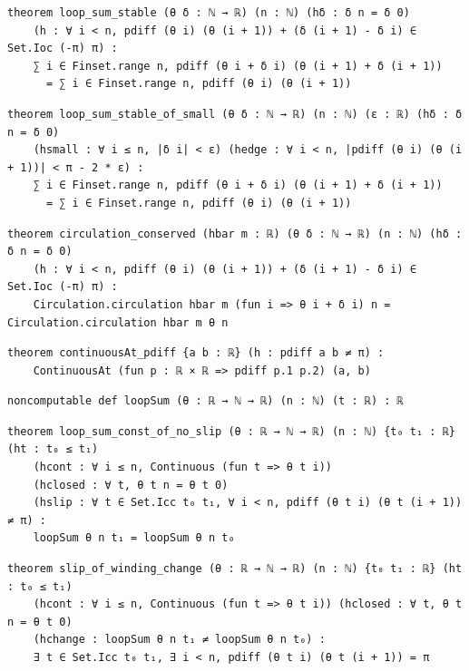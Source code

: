 \begin{lstlisting}[style=leancat]
theorem loop_sum_stable (θ δ : ℕ → ℝ) (n : ℕ) (hδ : δ n = δ 0)
    (h : ∀ i < n, pdiff (θ i) (θ (i + 1)) + (δ (i + 1) - δ i) ∈ Set.Ioc (-π) π) :
    ∑ i ∈ Finset.range n, pdiff (θ i + δ i) (θ (i + 1) + δ (i + 1))
      = ∑ i ∈ Finset.range n, pdiff (θ i) (θ (i + 1))
\end{lstlisting}

\begin{lstlisting}[style=leancat]
theorem loop_sum_stable_of_small (θ δ : ℕ → ℝ) (n : ℕ) (ε : ℝ) (hδ : δ n = δ 0)
    (hsmall : ∀ i ≤ n, |δ i| < ε) (hedge : ∀ i < n, |pdiff (θ i) (θ (i + 1))| < π - 2 * ε) :
    ∑ i ∈ Finset.range n, pdiff (θ i + δ i) (θ (i + 1) + δ (i + 1))
      = ∑ i ∈ Finset.range n, pdiff (θ i) (θ (i + 1))
\end{lstlisting}

\begin{lstlisting}[style=leancat]
theorem circulation_conserved (hbar m : ℝ) (θ δ : ℕ → ℝ) (n : ℕ) (hδ : δ n = δ 0)
    (h : ∀ i < n, pdiff (θ i) (θ (i + 1)) + (δ (i + 1) - δ i) ∈ Set.Ioc (-π) π) :
    Circulation.circulation hbar m (fun i => θ i + δ i) n = Circulation.circulation hbar m θ n
\end{lstlisting}

\begin{lstlisting}[style=leancat]
theorem continuousAt_pdiff {a b : ℝ} (h : pdiff a b ≠ π) :
    ContinuousAt (fun p : ℝ × ℝ => pdiff p.1 p.2) (a, b)
\end{lstlisting}

\begin{lstlisting}[style=leancat]
noncomputable def loopSum (θ : ℝ → ℕ → ℝ) (n : ℕ) (t : ℝ) : ℝ
\end{lstlisting}

\begin{lstlisting}[style=leancat]
theorem loop_sum_const_of_no_slip (θ : ℝ → ℕ → ℝ) (n : ℕ) {t₀ t₁ : ℝ} (ht : t₀ ≤ t₁)
    (hcont : ∀ i ≤ n, Continuous (fun t => θ t i))
    (hclosed : ∀ t, θ t n = θ t 0)
    (hslip : ∀ t ∈ Set.Icc t₀ t₁, ∀ i < n, pdiff (θ t i) (θ t (i + 1)) ≠ π) :
    loopSum θ n t₁ = loopSum θ n t₀
\end{lstlisting}

\begin{lstlisting}[style=leancat]
theorem slip_of_winding_change (θ : ℝ → ℕ → ℝ) (n : ℕ) {t₀ t₁ : ℝ} (ht : t₀ ≤ t₁)
    (hcont : ∀ i ≤ n, Continuous (fun t => θ t i)) (hclosed : ∀ t, θ t n = θ t 0)
    (hchange : loopSum θ n t₁ ≠ loopSum θ n t₀) :
    ∃ t ∈ Set.Icc t₀ t₁, ∃ i < n, pdiff (θ t i) (θ t (i + 1)) = π
\end{lstlisting}

